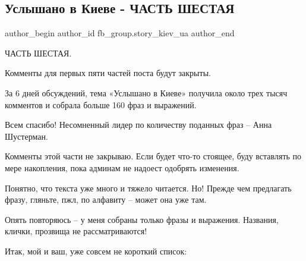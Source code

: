  
 
 
 
 
 
\subsection{Услышано в Киеве - ЧАСТЬ ШЕСТАЯ}
\label{sec:25_07_2021.fb.fb_group.story_kiev_ua.1.uslyshano_v_kieve_6}
 
\ifcmt
 author_begin
   author_id fb_group.story_kiev_ua
 author_end
\fi

ЧАСТЬ ШЕСТАЯ.

Комменты для первых пяти частей поста будут закрыты.

За 6 дней обсуждений, тема «Услышано в Киеве» получила около трех тысяч
комментов и собрала больше 160 фраз и выражений.

Всем спасибо! Несомненный лидер по количеству поданных фраз – Анна Шустерман.

Комменты этой части не закрываю. Если будет что-то стоящее, буду вставлять по
мере накопления, пока админам не надоест одобрять изменения.

Понятно, что текста уже много и тяжело читается. Но! Прежде чем предлагать
фразу, гляньте, пжл, по алфавиту – может она уже там.

Опять повторяюсь – у меня собраны только фразы и выражения. Названия, клички,
прозвища не рассматриваются!

Итак, мой и ваш, уже совсем не короткий список:

